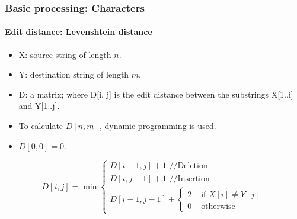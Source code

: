 \documentclass[xcolor=table]{beamer}
\begin{document}
\begin{frame}
\frametitle{Basic processing: Characters}
\framesubtitle{Edit distance: Levenshtein distance}

\begin{itemize}
	\item X: source string of length $n$.
	\item Y: destination string of length $m$.
	\item D: a matrix; where D[i, j] is the edit distance between the substrings X[1..i] and Y[1..j].
	\item To calculate $D[n, m]$, dynamic programming is used.
	\item $D[0, 0] = 0$.
\end{itemize}

\[
D[i, j] = \min 
\begin{cases}
D[i - 1, j] + 1 \text{ //Deletion}\\
D[i, j-1] + 1 \text{ //Insertion}\\
D[i-1, j-1] + \begin{cases}
2 & \text{ if } X[i] \ne Y[j] \\
0 & \text{ otherwise}
\end{cases}
\end{cases}
\]

\end{frame}
\end{document}
